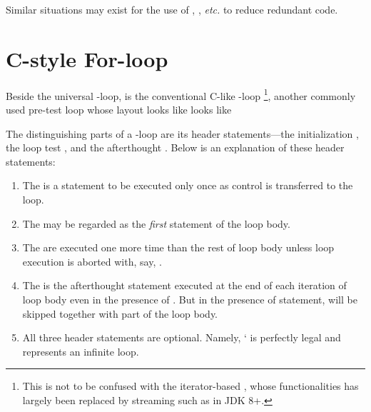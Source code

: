 %        
%        

%
%    


Similar situations may exist for the use of , , \textit{etc.} to reduce
redundant code.


\section{C-style For-loop}\label{sec:for-loop}

Beside the universal -loop, is the conventional C-like -loop
\footnote{This is not to be confused with the iterator-based ,
whose functionalities has largely been replaced by streaming such as in JDK 8+.},
another commonly used pre-test loop whose layout looks like looks like

The distinguishing parts of a -loop are its header statements---the
initialization , the loop test , and the afterthought .
Below is an explanation of these header statements:
\begin{enumerate}
    \item The  is a statement to be executed only once as control is transferred to
    the loop.
    \item The  may be regarded as the \emph{first} statement of the loop body.
    \item The  are executed one more time than the rest of loop body
    unless loop execution is aborted with, say, .
    \item The  is the afterthought statement executed at the end of each
    iteration of loop body even in the presence of .
    But in the presence of  statement,  will be skipped together with
    part of the loop body.
    \item All three header statements are optional.
    Namely, ` is perfectly legal and represents an infinite loop.
\end{enumerate}



